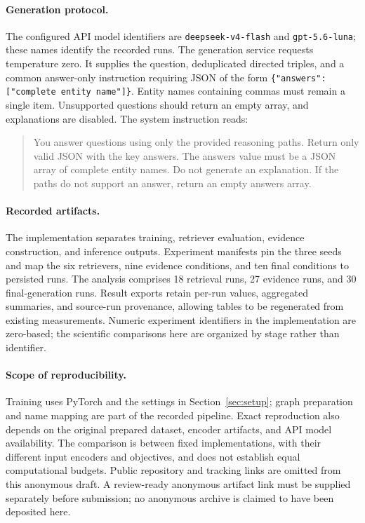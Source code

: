 \paragraph{Generation protocol.}
The configured API model identifiers are \texttt{deepseek-v4-flash} and \texttt{gpt-5.6-luna}; these names identify the recorded runs. The generation service requests temperature zero. It supplies the question, deduplicated directed triples, and a common answer-only instruction requiring JSON of the form \texttt{\{"answers": ["complete entity name"]\}}. Entity names containing commas must remain a single item. Unsupported questions should return an empty array, and explanations are disabled. The system instruction reads:
\begin{quote}\small
You answer questions using only the provided reasoning paths. Return only valid JSON with the key answers. The answers value must be a JSON array of complete entity names. Do not generate an explanation. If the paths do not support an answer, return an empty answers array.
\end{quote}

\paragraph{Recorded artifacts.}
The implementation separates training, retriever evaluation, evidence construction, and inference outputs. Experiment manifests pin the three seeds and map the six retrievers, nine evidence conditions, and ten final conditions to persisted runs. The analysis comprises 18 retrieval runs, 27 evidence runs, and 30 final-generation runs. Result exports retain per-run values, aggregated summaries, and source-run provenance, allowing tables to be regenerated from existing measurements. Numeric experiment identifiers in the implementation are zero-based; the scientific comparisons here are organized by stage rather than identifier.

\paragraph{Scope of reproducibility.}
Training uses PyTorch and the settings in Section~\ref{sec:setup}; graph preparation and name mapping are part of the recorded pipeline. Exact reproduction also depends on the original prepared dataset, encoder artifacts, and API model availability. The comparison is between fixed implementations, with their different input encoders and objectives, and does not establish equal computational budgets. Public repository and tracking links are omitted from this anonymous draft. A review-ready anonymous artifact link must be supplied separately before submission; no anonymous archive is claimed to have been deposited here.
